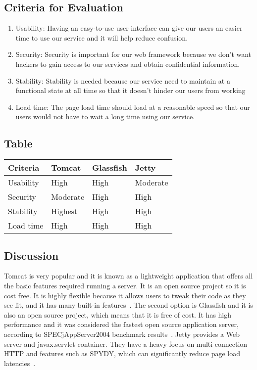 \documentclass[10pt,letterpaper,onecolumn,journal]{IEEEtran}
\begin{document}
\subsection{Criteria for Evaluation}
\begin{enumerate}
  \item Usability: Having an easy-to-use user interface can give our users an easier time to use our service and it will help reduce confusion.
  \item Security: Security is important for our web framework because we don't want hackers to gain access to our services and obtain confidential information.
  \item Stability: Stability is needed because our service need to maintain at a functional state at all time so that it doesn't hinder our users from working
  \item Load time: The page load time should load at a reasonable speed so that our users would not have to wait a long time using our service.
\end{enumerate}
\subsection{Table}
\begin{center}
  \begin{tabular}{llll}
    Criteria & Tomcat & Glassfish & Jetty \\ \midrule
    Usability       & High & High & Moderate \\ \midrule
    Security           & Moderate & High & High \\ \midrule
    Stability      & Highest & High & High \\ \midrule
    Load time  & High & High & High \\ \bottomrule
  \end{tabular}
\end{center}
\subsection{Discussion}
Tomcat is very popular and it is known as a lightweight application that offers all the basic features required running a server.
It is an open source project so it is cost free.
It is highly flexible because it allows users to tweak their code as they see fit, and it has many built-in features~\cite{tomcat}.
The second option is Glassfish and it is also an open source project, which means that it is free of cost.
It has high performance and it was considered the fastest open source application server, according to SPECjAppServer2004 benchmark results~\cite{glassfish}.
Jetty provides a Web server and javax.servlet container.
They have a heavy focus on multi-connection HTTP and features such as SPYDY, which can significantly reduce page load latencies~\cite{jetty}.
\end{document}
